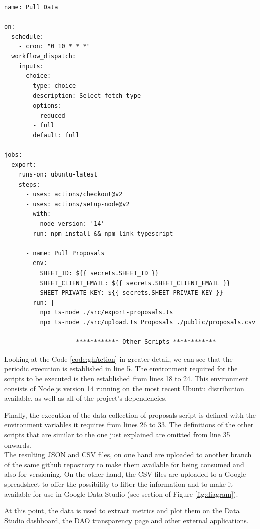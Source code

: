 \documentclass[MSE,Master,english]{twbook}%
\newcommand{\rom}[1]{\uppercase\expandafter{\romannumeral #1\relax}}
\begin{document}
\begin{lstlisting}[caption={Code snippet from the Github Action configuration file}, label={code:ghAction}]
name: Pull Data

on:
  schedule:
    - cron: "0 10 * * *"
  workflow_dispatch:
    inputs:
      choice:
        type: choice
        description: Select fetch type
        options:
        - reduced
        - full
        default: full

jobs:
  export:
    runs-on: ubuntu-latest
    steps:
      - uses: actions/checkout@v2
      - uses: actions/setup-node@v2
        with:
          node-version: '14'
      - run: npm install && npm link typescript

      - name: Pull Proposals
        env:
          SHEET_ID: ${{ secrets.SHEET_ID }}
          SHEET_CLIENT_EMAIL: ${{ secrets.SHEET_CLIENT_EMAIL }}
          SHEET_PRIVATE_KEY: ${{ secrets.SHEET_PRIVATE_KEY }}
        run: |
          npx ts-node ./src/export-proposals.ts
          npx ts-node ./src/upload.ts Proposals ./public/proposals.csv

                    ************ Other Scripts ************
\end{lstlisting}

Looking at the Code \ref{code:ghAction} in greater detail, we can see that the periodic execution is established in line 5. The environment required for the scripts to be executed is then established from lines 18 to 24. This environment consists of Node.js version 14 running on the most recent Ubuntu distribution available, as well as all of the project's dependencies.

Finally, the execution of the data collection of proposals script is defined with the environment variables it requires from lines 26 to 33. The definitions of the other scripts that are similar to the one just explained are omitted from line 35 onwards. \\

The resulting JSON and CSV files, on one hand are uploaded to another branch of the same github repository to make them available for being consumed and also for versioning. On the other hand, the CSV files are uploaded to a Google spreadsheet\cite{transparencySheet} to offer the possibility to filter the information and to make it available for use in Google Data Studio (see section \rom{4} of Figure \ref{fig:diagram}).

At this point, the data is used to extract metrics and plot them on the Data Studio dashboard, the \gls{DAO} transparency page\cite{transparencyPage} and other external applications.
\end{document}
